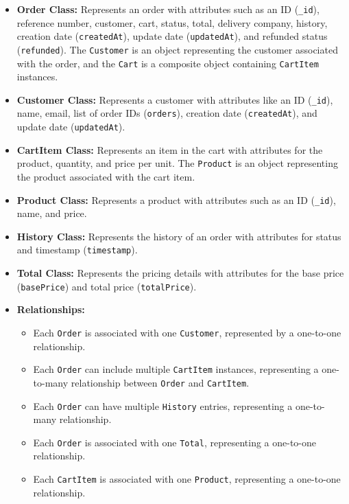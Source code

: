 \begin{itemize}
    \item \textbf{Order Class:} Represents an order with attributes such as an ID (\texttt{\_id}), reference number, customer, cart, status, total, delivery company, history, creation date (\texttt{createdAt}), update date (\texttt{updatedAt}), and refunded status (\texttt{refunded}). The \texttt{Customer} is an object representing the customer associated with the order, and the \texttt{Cart} is a composite object containing \texttt{CartItem} instances.

    \item \textbf{Customer Class:} Represents a customer with attributes like an ID (\texttt{\_id}), name, email, list of order IDs (\texttt{orders}), creation date (\texttt{createdAt}), and update date (\texttt{updatedAt}).

    \item \textbf{CartItem Class:} Represents an item in the cart with attributes for the product, quantity, and price per unit. The \texttt{Product} is an object representing the product associated with the cart item.

    \item \textbf{Product Class:} Represents a product with attributes such as an ID (\texttt{\_id}), name, and price.

    \item \textbf{History Class:} Represents the history of an order with attributes for status and timestamp (\texttt{timestamp}).

    \item \textbf{Total Class:} Represents the pricing details with attributes for the base price (\texttt{basePrice}) and total price (\texttt{totalPrice}).

    \item \textbf{Relationships:}
    \begin{itemize}
        \item Each \texttt{Order} is associated with one \texttt{Customer}, represented by a one-to-one relationship.
        \item Each \texttt{Order} can include multiple \texttt{CartItem} instances, representing a one-to-many relationship between \texttt{Order} and \texttt{CartItem}.
        \item Each \texttt{Order} can have multiple \texttt{History} entries, representing a one-to-many relationship.
        \item Each \texttt{Order} is associated with one \texttt{Total}, representing a one-to-one relationship.
        \item Each \texttt{CartItem} is associated with one \texttt{Product}, representing a one-to-one relationship.
    \end{itemize}
\end{itemize}

